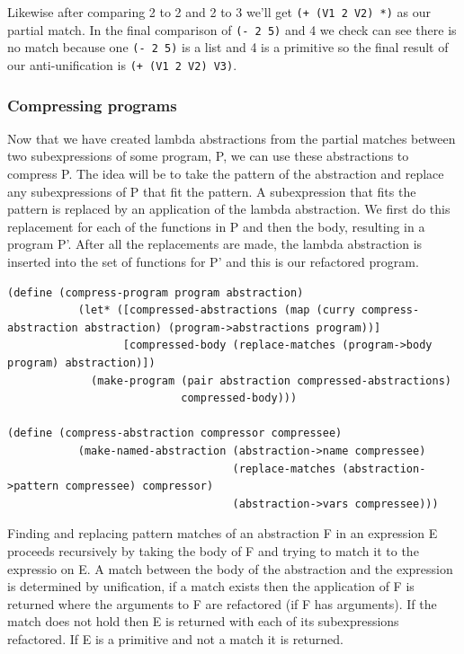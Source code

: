 \documentclass[a4paper,10pt]{article}
\begin{document}
Likewise after comparing 2 to 2 and 2 to 3 we'll get \texttt{(+ (V1 2 V2) *)} as our partial match.
In the final comparison of \texttt{(- 2 5)} and 4 we check can see there is no match because one \texttt{(- 2 5)} is a list and 4 is a primitive so the final result of our anti-unification is \texttt{(+ (V1 2 V2) V3)}.


\subsubsection{Compressing programs}
Now that we have created lambda abstractions from the partial matches between two subexpressions of some program, P, we can use these abstractions to compress P.  The idea will be to take the pattern of the abstraction and replace any subexpressions of P that fit the pattern.  A subexpression that fits the pattern is replaced by an application of the lambda abstraction.  We first do this replacement for each of the functions in P and then the body, resulting in a program P'.  After all the replacements are made, the lambda abstraction is inserted into the set of functions for P' and this is our refactored program.
\begin{lstlisting}[frame=trBL]
(define (compress-program program abstraction)
           (let* ([compressed-abstractions (map (curry compress-abstraction abstraction) (program->abstractions program))]
                  [compressed-body (replace-matches (program->body program) abstraction)])
             (make-program (pair abstraction compressed-abstractions)
                           compressed-body)))

(define (compress-abstraction compressor compressee)
           (make-named-abstraction (abstraction->name compressee)
                                   (replace-matches (abstraction->pattern compressee) compressor)
                                   (abstraction->vars compressee)))                           
\end{lstlisting}
Finding and replacing pattern matches of an abstraction F in an expression E proceeds recursively by taking the body of F and trying to match it to the expressio on E.  A match between the body of the abstraction and the expression is determined by unification, if a match exists then the application of F is returned where the arguments to F are refactored (if F has arguments).  If the match does not hold then E is returned with each of its subexpressions refactored.  If E is a primitive and not a match it is returned.
\end{document}
